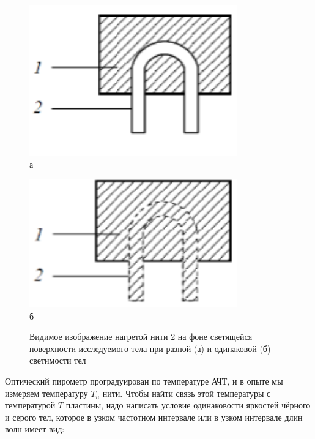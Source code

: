 \begin{figure}[htb]
    \centering
    \begin{minipage}{0.45\textwidth}
        \centering
        \includegraphics[width=0.8\textwidth]{images/fig_brightness_a.png}\\
        \small а
    \end{minipage}
    \hfill
    \begin{minipage}{0.45\textwidth}
        \centering
        \includegraphics[width=0.8\textwidth]{images/fig_brightness_b.png}\\
        \small б
    \end{minipage}
    \caption{Видимое изображение нагретой нити 2 на фоне светящейся поверхности исследуемого тела при разной (а) и одинаковой (б) светимости тел}
    \label{fig:brightness_combined}
\end{figure}

Оптический пирометр проградуирован по температуре АЧТ, и в опыте мы измеряем температуру \( T_n \) нити. Чтобы найти связь этой температуры с температурой \( T \) пластины, надо написать условие одинаковости яркостей чёрного и серого тел, которое в узком частотном интервале или в узком интервале длин волн имеет вид:

